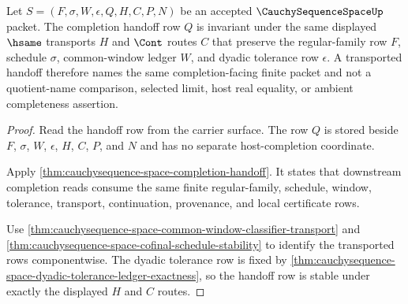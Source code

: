 \begin{theorem}
\label{thm:cauchysequence-space-completion-handoff-stability}
Let $S=(F,\sigma,W,\epsilon,Q,H,C,P,N)$ be an accepted $\CauchySequenceSpaceUp$ packet. The completion handoff row $Q$ is invariant under the same displayed $\hsame$ transports $H$ and $\Cont$ routes $C$ that preserve the regular-family row $F$, schedule $\sigma$, common-window ledger $W$, and dyadic tolerance row $\epsilon$. A transported handoff therefore names the same completion-facing finite packet and not a quotient-name comparison, selected limit, host real equality, or ambient completeness assertion.
\end{theorem}
\begin{proof}
Read the handoff row from the carrier surface. The row $Q$ is stored beside $F$, $\sigma$, $W$, $\epsilon$, $H$, $C$, $P$, and $N$ and has no separate host-completion coordinate.

Apply \autoref{thm:cauchysequence-space-completion-handoff}. It states that downstream completion reads consume the same finite regular-family, schedule, window, tolerance, transport, continuation, provenance, and local certificate rows.

Use \autoref{thm:cauchysequence-space-common-window-classifier-transport} and \autoref{thm:cauchysequence-space-cofinal-schedule-stability} to identify the transported rows componentwise. The dyadic tolerance row is fixed by \autoref{thm:cauchysequence-space-dyadic-tolerance-ledger-exactness}, so the handoff row is stable under exactly the displayed $H$ and $C$ routes.
\end{proof}

